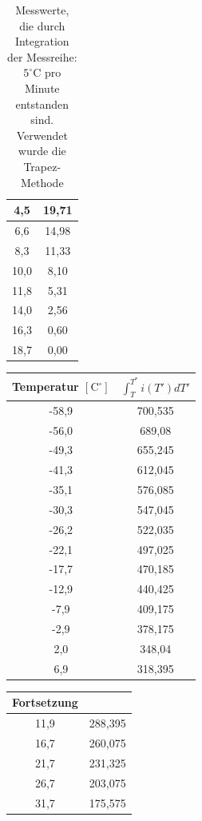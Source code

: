 \begin{table}[htbp]
\begin{minipage}[t]{0.45\textwidth}
\begin{tabular}{c|c}
4,5 &19,71\\\hline
6,6 &14,98\\\hline
8,3 &11,33\\\hline
10,0 &8,10\\\hline
11,8 &5,31\\\hline
14,0 &2,56\\\hline
16,3 &0,60\\\hline
18,7 &0,00\\\hline
\end{tabular}
\end{minipage}
\caption{Messwerte, die durch Integration der Messreihe: $5^\circ$C pro Minute entstanden sind. Verwendet wurde die Trapez-Methode }
\label{tab_int1}
\end{table}

\begin{table}[htbp]
\begin{minipage}[t]{0.45\textwidth}
\centering
\begin{tabular}{c|c}
Temperatur $[\text{C}^\circ]$ & $\int ^{T^*}_{T} i(T')dT'$\\\hline
-58,9 &700,535\\\hline
-56,0 &689,08\\\hline
-49,3 &655,245\\\hline
-41,3 &612,045\\\hline
-35,1 &576,085\\\hline
-30,3 &547,045\\\hline
-26,2 &522,035\\\hline
-22,1 &497,025\\\hline
-17,7 &470,185\\\hline
-12,9 &440,425\\\hline
-7,9 &409,175\\\hline
-2,9 &378,175\\\hline
2,0 &348,04\\\hline
6,9 &318,395\\
\end{tabular}
\end{minipage}
\begin{minipage}[t]{0.45\textwidth}
\centering
\begin{tabular}{c|c}
Fortsetzung & \\\hline
11,9 &288,395\\\hline
16,7 &260,075\\\hline
21,7 &231,325\\\hline
26,7 &203,075\\\hline
31,7 &175,575\\\hline

\end{tabular}
\end{minipage}
\end{table}
